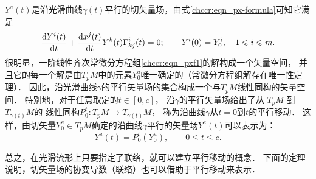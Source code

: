 $Y^a(t)$是沿光滑曲线$\gamma(t)$平行的切矢量场，由式\eqref{chccr:eqn_px-formula}可知它满足
\begin{equation}\label{chccr:eqn_pxf1}
    \frac{{\rm d} Y^i(t)}{{\rm d}t} +
    \frac{{\rm d}x^j(t)}{{\rm d} t} Y^k(t) \Gamma_{kj}^i(t) =0;
    \qquad Y^i(0)=Y^i_0,\quad 1\leqslant i \leqslant m.
\end{equation}
很明显，一阶线性齐次常微分方程组\eqref{chccr:eqn_pxf1}的解构成一个矢量空间，
并且它的每一个解是由$T_p M$中的元素$Y^a_0$唯一确定的（常微分方程组解存在唯一性定理）．
因此，沿光滑曲线$\gamma$的平行矢量场的集合构成一个与$T_p M$线性同构的矢量空间．
特别地，对于任意取定的$t\in [0,c]$，
沿$\gamma$的平行矢量场给出了从 $T_p M$ 到 $T_{\gamma(t)} M$的
线性同构$P_0^t: T_p M \rightarrow T_{\gamma(t)} M$，
称为沿曲线$\gamma$从$t=0$到$t$的{\heiti 平行移动}．
这样，由切矢量$Y^a_0 \in T_p M$确定的沿曲线$\gamma$平行的矢量场$Y^a(t)$可以表示为：
\begin{equation}
    Y^a(t)=P_0^t \left(Y^a_0\right), \qquad 0 \leqslant t \leqslant c .
\end{equation}


总之，在光滑流形上只要指定了联络，就可以建立平行移动的概念．
下面的定理说明，切矢量场的协变导数（联络）也可以借助于平行移动来表示．

